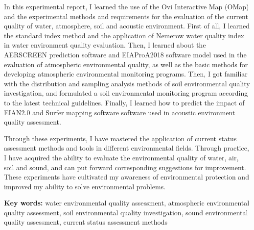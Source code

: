 \documentclass{cdut_thesis_twoside}
\begin{document}
\null\par
\begin{englishabstract}
    In this experimental report, I learned the use of the Ovi Interactive Map (OMap) and the experimental methods and requirements for the evaluation of the current quality of water, atmosphere, soil and acoustic environment. First of all, I learned the standard index method and the application of Nemerow water quality index in water environment quality evaluation. Then, I learned about the AERSCREEN prediction software and EIAProA2018 software model used in the evaluation of atmospheric environmental quality, as well as the basic methods for developing atmospheric environmental monitoring programs. Then, I got familiar with the distribution and sampling analysis methods of soil environmental quality investigation, and formulated a soil environmental monitoring program according to the latest technical guidelines. Finally, I learned how to predict the impact of EIAN2.0 and Surfer mapping software software used in acoustic environment quality assessment.

    Through these experiments, I have mastered the application of current status assessment methods and tools in different environmental fields. Through practice, I have acquired the ability to evaluate the environmental quality of water, air, soil and sound, and can put forward corresponding suggestions for improvement. These experiments have cultivated my awareness of environmental protection and improved my ability to solve environmental problems.


\par              %
\null             %
\par              %
\null             %
\par              %
\noindent \textbf{Key words:} water environmental quality assessment, atmospheric environmental quality assessment, soil environmental quality investigation, sound environmental quality assessment, current status assessment methods    %
\end{englishabstract}
\null

{\thispagestyle{fancy}}                           %
\tableofcontents        %
{\thispagestyle{fancy}}                           %

\newpage\null\par
\listoffigures        %
{\thispagestyle{fancy}}                           %
\newpage\null\par
\listoftables         %
{\thispagestyle{fancy}}                           %
\end{document}
